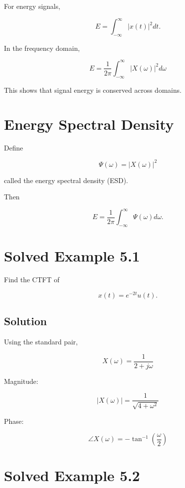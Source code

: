 For energy signals,

\[
E=
\int_{-\infty}^{\infty}|x(t)|^2dt.
\]

In the frequency domain,

\[
\boxed{
E=
\frac{1}{2\pi}
\int_{-\infty}^{\infty}|X(\omega)|^2d\omega
}
\]

This shows that signal energy is conserved across domains.


\section{Energy Spectral Density}

Define

\[
\boxed{
\Psi(\omega)=|X(\omega)|^2
}
\]

called the energy spectral density (ESD).

Then

\[
E=
\frac{1}{2\pi}
\int_{-\infty}^{\infty}\Psi(\omega)d\omega.
\]


\section{Solved Example 5.1}

Find the CTFT of

\[
x(t)=e^{-2t}u(t).
\]


\subsection{Solution}

Using the standard pair,

\[
\boxed{
X(\omega)=\frac{1}{2+j\omega}
}
\]

Magnitude:

\[
|X(\omega)|=
\frac{1}{\sqrt{4+\omega^2}}
\]

Phase:

\[
\angle X(\omega)=
-\tan^{-1}\left(\frac{\omega}{2}\right)
\]


\section{Solved Example 5.2}

